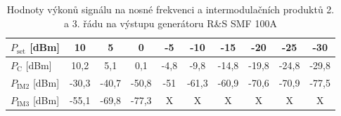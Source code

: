 \documentclass[11pt,a4paper]{article}
\begin{document}
\begin{table}[!ht]
\begin{center}
\begin{tabular}{| l || c | c | c | c | c | c | c | c | c |}
    \hline
    $P_{\mathrm{set}}$ [dBm] & 10 & 5 & 0 & -5 & -10 & -15 & -20 & -25 & -30 \\
    \hline
    $P_{\mathrm{C}}$ [dBm] & 10,2 & 5,1 & 0,1 & -4,8 & -9,8 & -14,8 & -19,8 & -24,8 & -29,8 \\
    \hline
    $P_{\mathrm{IM2}}$ [dBm] & -30,3 & -40,7 & -50,8 & -51 & -61,3 & -60,9 & -70,6 & -70,9 & -77,5\\
    \hline
    $P_{\mathrm{IM3}}$ [dBm] & -55,1 & -69,8 & -77,3 & X & X & X & X & X & X \\
    \hline
\end{tabular}
\caption{Hodnoty výkonů signálu na nosné frekvenci a intermodulačních produktů 2. a 3. řádu na výstupu generátoru R\&S SMF 100A}
\label{table:intermodulation-products-RS}
\end{center}
\end{table}
\end{document}
